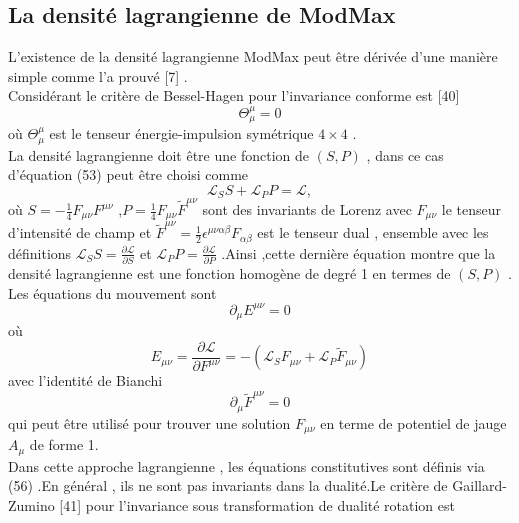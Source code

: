 \documentclass[12pt,a4paper, openany]{article}
\begin{document}
\subsection{La densité lagrangienne de ModMax} 

\hspace{0.5cm}L'existence de la densité lagrangienne ModMax peut \^{e}tre dérivée d'une manière simple comme l'a prouvé [7] .\\
Considérant le critère de Bessel-Hagen pour l'invariance conforme est [40]
\begin{equation}
	\Theta_{\mu}^{\mu}=0
\end{equation}
où $\Theta_{\mu}^{\mu}$ est le tenseur énergie-impulsion  symétrique $4\times4$ .\\
La densité lagrangienne doit \^{e}tre une fonction de $(S,P)$ , dans ce cas d'équation (53) peut \^{e}tre choisi comme 
\begin{equation}
\mathcal{L}_S S+\mathcal{L}_P P =\mathcal{L} ,	
\end{equation} 
où  $S=-\frac{1}{4}F_{\mu \nu}F^{\mu \nu}$ ,$P=\frac{1}{4}F_{\mu \nu}\tilde{F}^{\mu \nu}$ sont des invariants de Lorenz avec $F_{\mu \nu}$ le tenseur d'intensité de champ et $\tilde{F}^{\mu \nu}=\frac{1}{2}\epsilon^{\mu \nu \alpha \beta}F_{\alpha \beta}$ est le tenseur dual , ensemble avec les définitions $\mathcal{L}_S S=\frac{\partial \mathcal{L}}{\partial S}$ et $\mathcal{L}_P P=\frac{\partial \mathcal{L}}{\partial P} $ .Ainsi ,cette dernière équation montre que la densité lagrangienne est une fonction homogène de degré 1 en termes de $(S,P)$ .\\
Les équations du mouvement sont 
\begin{equation}
	\partial_{\mu}E^{\mu \nu} =0
\end{equation}
où
\begin{equation} 
E_{\mu \nu}=\frac{\partial \mathcal{L}}{\partial{F}^{\mu \nu}}=-\left(\mathcal{L}_S F_{\mu \nu} +\mathcal{L}_P \tilde{F}_{\mu \nu}\right)
\end{equation}
avec l'identité de Bianchi 
\begin{equation}
	\partial_{\mu}\tilde{F}^{\mu \nu} =0
\end{equation}
qui peut \^{e}tre utilisé pour trouver une solution $ F_{\mu \nu} $ en terme de potentiel de jauge $A_{\mu}$ de forme 1.\\
Dans cette approche lagrangienne , les équations constitutives sont définis via (56) .En général , ils ne sont pas invariants dans la dualité.Le critère de Gaillard-Zumino [41] pour l'invariance sous transformation de dualité rotation est 
\end{document}
